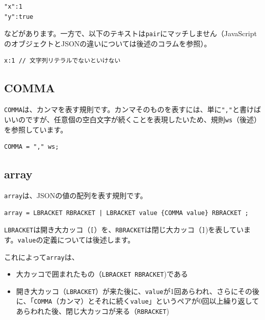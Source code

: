 \begin{verbatim}
"x":1
"y":true
\end{verbatim}

などがあります。一方で、以下のテキストは\texttt{pair}にマッチしません（JavaScriptのオブジェクトとJSONの違いについては後述のコラムを参照）。

\begin{verbatim}
x:1 // 文字列リテラルでないといけない
\end{verbatim}

\hypertarget{chapter3-comma}{%
\subsection{COMMA}\label{chapter3-comma}}

\texttt{COMMA}は、カンマを表す規則です。カンマそのものを表すには、単に\texttt{","}と書けばいいのですが、任意個の空白文字が続くことを表現したいため、規則\texttt{ws}（後述）を参照しています。

\begin{verbatim}
COMMA = "," ws;
\end{verbatim}

\hypertarget{chapter3-array}{%
\subsection{array}\label{chapter3-array}}

\texttt{array}は、JSONの値の配列を表す規則です。

\begin{verbatim}
array = LBRACKET RBRACKET | LBRACKET value {COMMA value} RBRACKET ;
\end{verbatim}

\texttt{LBRACKET}は開き大カッコ（\texttt{{[}}）を、\texttt{RBRACKET}は閉じ大カッコ（\texttt{{]}})を表しています。\texttt{value}の定義については後述します。

これによって\texttt{array}は、

\begin{itemize}
\tightlist
\item
  大カッコで囲まれたもの（\texttt{LBRACKET\ RBRACKET})である
\item
  開き大カッコ（\texttt{LBRACKET}）が来た後に、\texttt{value}が1回あらわれ、さらにその後に、「\texttt{COMMA}（カンマ）とそれに続く\texttt{value}」というペアが0回以上繰り返してあらわれた後、閉じ大カッコが来る（\texttt{RBRACKET})
\end{itemize}

